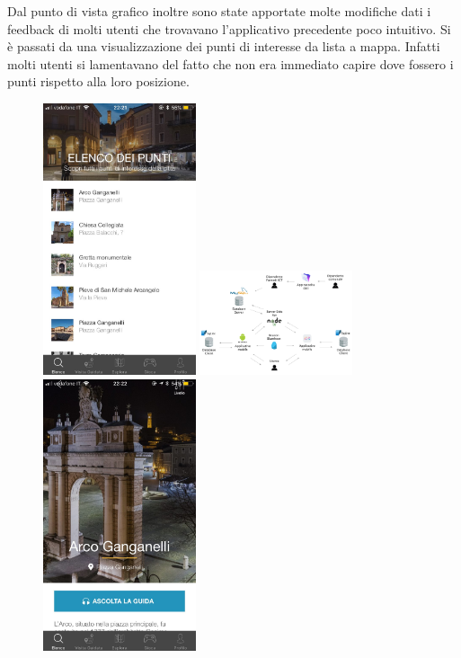 Dal punto di vista grafico inoltre sono state apportate molte modifiche dati i feedback di molti utenti che trovavano l’applicativo precedente poco intuitivo. Si è passati da una visualizzazione dei punti di interesse da lista a mappa. Infatti molti utenti si lamentavano del fatto che non era immediato capire dove fossero i punti rispetto alla loro posizione.\vspace{5mm}

\begin{figure}[h]
\centering
\includegraphics[width=0.4\textwidth]{images/screenSantarcangelo.jpg}
\includegraphics[width=0.4\textwidth]{images/SchemaOpenAirMuseum.png}
\includegraphics[width=0.4\textwidth]{images/screenSantarcangelo1.jpg}

\end{figure}
